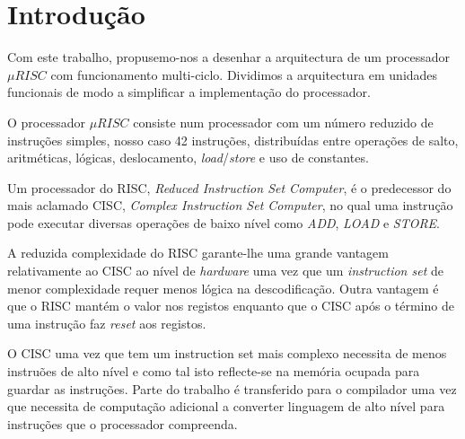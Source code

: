 \chapter{Introdução}
Com este trabalho, propusemo-nos a desenhar a arquitectura de um processador \mbox{$\mu RISC$} com funcionamento multi-ciclo. Dividimos a arquitectura em unidades funcionais de modo a simplificar a implementação do processador.\par
O processador \mbox{$\mu RISC$} consiste num processador com um número reduzido de instruções simples, nosso caso 42 instruções, distribuídas entre operações de salto, aritméticas, lógicas, deslocamento, \textit{load}/\textit{store} e uso de constantes.\par

Um processador do RISC, \textit{Reduced Instruction Set Computer}, é o predecessor do mais aclamado CISC, \textit{Complex Instruction Set Computer}, no qual uma instrução pode executar diversas operações de baixo nível como \textit{ADD}, \textit{LOAD} e \textit{STORE}. 

A reduzida complexidade do RISC garante-lhe uma grande vantagem relativamente ao CISC ao nível de \textit{hardware} uma vez que um \textit{instruction set} de menor complexidade requer menos lógica na descodificação. Outra vantagem é que o RISC mantém o valor nos registos enquanto que o CISC após o término de uma instrução faz \textit{reset} aos registos.

O CISC uma vez que tem um instruction set mais complexo necessita de menos instruões de alto nível e como tal isto reflecte-se na memória ocupada para guardar as instruções. Parte do trabalho é transferido para o compilador uma vez que necessita de computação adicional a converter linguagem de alto nível para instruções que o processador compreenda.